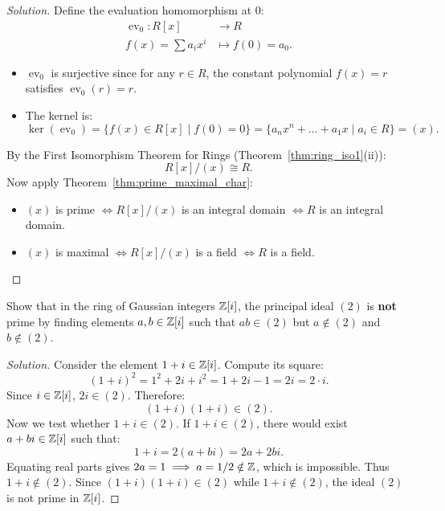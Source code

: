 \begin{proof}[Solution]
Define the evaluation homomorphism at 0:
\begin{align*}
\operatorname{ev}_0: R[x] &\longrightarrow R \\
f(x) = \sum a_i x^i &\longmapsto f(0) = a_0.
\end{align*}
\begin{itemize}[leftmargin=1.5em, itemsep=3pt]
    \item $\operatorname{ev}_0$ is surjective since for any $r \in R$, the constant polynomial $f(x) = r$ satisfies $\operatorname{ev}_0(r) = r$.
    \item The kernel is:
    \begin{equation*}
    \ker(\operatorname{ev}_0) = \{ f(x) \in R[x] \mid f(0) = 0 \} = \{ a_n x^n + \dots + a_1 x \mid a_i \in R \} = (x).
    \end{equation*}
\end{itemize}
By the First Isomorphism Theorem for Rings (Theorem~\ref{thm:ring_iso1}(ii)):
\begin{equation*}
R[x]/(x) \cong R.
\end{equation*}
Now apply Theorem~\ref{thm:prime_maximal_char}:
\begin{itemize}[leftmargin=1.5em, itemsep=4pt]
    \item $(x)$ is prime $\iff R[x]/(x)$ is an integral domain $\iff R$ is an integral domain.
    \item $(x)$ is maximal $\iff R[x]/(x)$ is a field $\iff R$ is a field.
\end{itemize}
\end{proof}

\begin{problem}
Show that in the ring of Gaussian integers $\mathbb{Z}[i]$, the principal ideal $(2)$ is \textbf{not} prime by finding elements $a, b \in \mathbb{Z}[i]$ such that $ab \in (2)$ but $a \notin (2)$ and $b \notin (2)$.
\end{problem}

\begin{proof}[Solution]
Consider the element $1 + i \in \mathbb{Z}[i]$.
Compute its square:
\begin{equation*}
(1 + i)^2 = 1^2 + 2i + i^2 = 1 + 2i - 1 = 2i = 2 \cdot i.
\end{equation*}
Since $i \in \mathbb{Z}[i]$, $2i \in (2)$.
Therefore:
\begin{equation*}
(1 + i)(1 + i) \in (2).
\end{equation*}
Now we test whether $1 + i \in (2)$.
If $1 + i \in (2)$, there would exist $a + bi \in \mathbb{Z}[i]$ such that:
\begin{equation*}
1 + i = 2(a + bi) = 2a + 2bi.
\end{equation*}
Equating real parts gives $2a = 1 \implies a = 1/2 \notin \mathbb{Z}$, which is impossible.
Thus $1 + i \notin (2)$.
Since $(1+i)(1+i) \in (2)$ while $1+i \notin (2)$, the ideal $(2)$ is not prime in $\mathbb{Z}[i]$.
\end{proof}
